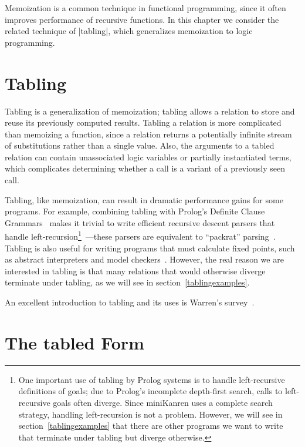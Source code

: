 Memoization is a common technique in functional programming, since it
often improves performance of recursive functions.  In this chapter we
consider the related technique of \scheme|tabling|, which generalizes
memoization to logic programming.

\section{Tabling}\label{tablingintro}

Tabling is a generalization of memoization; tabling allows a relation
to store and reuse its previously computed results.  Tabling a
relation is more complicated than memoizing a function, since a
relation returns a potentially infinite stream of substitutions rather
than a single value.  Also, the arguments to a tabled relation can
contain unassociated logic variables or partially instantiated terms,
which complicates determining whether a call is a variant of a
previously seen call.

Tabling, like memoization, can result in dramatic performance gains
for some programs.  For example, combining tabling with Prolog's Definite
Clause Grammars~\cite{dcg86} makes it trivial to write efficient
recursive descent parsers that handle left-recursion\footnote{One
  important use of tabling by Prolog systems is to handle
  left-recursive definitions of goals; due to Prolog's incomplete
  depth-first search, calls to left-recursive goals often diverge.
  Since miniKanren uses a complete search strategy, handling
  left-recursion is not a problem.  However, we will see in
  section~\ref{tablingexamples} that there are other programs we want
  to write that terminate under tabling but diverge
  otherwise.}~\cite{DBLP:conf/padl/BecketS08}---these parsers are
equivalent to ``packrat'' parsing~\cite{packrat02}.  Tabling is also
useful for writing programs that must calculate fixed points, such as
abstract interpreters and model checkers~\cite{memoingforlp,dra09}.
However, the real reason we are interested in tabling is that many
relations that would otherwise diverge terminate under tabling, as we
will see in section~\ref{tablingexamples}.

An excellent introduction to tabling and its uses is Warren's survey~\cite{memoingforlp}.

\section{The {\bf tabled} Form}\label{tablingform}

